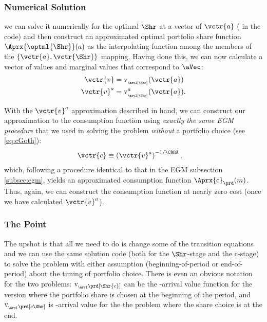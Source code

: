 \documentclass[titlepage, headings=optiontotocandhead]{econtex}
\begin{document}
\subsubsection{Numerical Solution}
we can solve it numerically for the optimal $\Shr$ at a vector of $\vctr{a}$ ({\aVecCode} in the code)  and then construct an approximated optimal portfolio share function $\Aprx{\optml{\Shr}}(a)$ as the interpolating function among the members of the $\{\vctr{a},\vctr{\Shr}\}$ mapping.  Having done this, we can now calculate a vector of values and marginal values that correspond to $\aVec$:
\begin{equation}\begin{gathered}\begin{aligned}
      \vctr{v}  & = \mathrm{v}_{_\arvl[\Shr]}(\vctr{a}) \label{eq:vShrEnd}
\\      \vctr{v}^a  & = \mathrm{v}^{a}_{_\arvl[\Shr]}(\vctr{a}).
    \end{aligned}\end{gathered}\end{equation}

With the $\vctr{v}^{a}$ approximation described in hand, we can construct our approximation to the consumption function using \emph{exactly the same EGM procedure} that we used in solving the problem \emph{without} a portfolio choice (see \eqref{eq:cGoth}):
\begin{equation}\begin{gathered}\begin{aligned}
      \vctr{c}  & \equiv  \left(\vctr{v}^{a}\right)^{-1/\CRRA} \label{eq:cVecPort},
    \end{aligned}\end{gathered}\end{equation}
which, following a procedure identical to that in the EGM subsection \ref{subsec:egm}, yields an approximated consumption function $\Aprx{\mathrm{c}}_{\prd}(m)$.  Thus, again, we can construct the consumption function at nearly zero cost (once we have calculated $\vctr{v}^{a}$).

\hypertarget{the-point}{}

\subsubsection{The Point}\label{subsubsec:the-point}

The upshot is that all we need to do is change some of the transition equations and we can use the same solution code (both for the $\Shr$-stage and the $\mathrm{c}$-stage) to solve the problem with either assumption (beginning-of-period or end-of-period) about the timing of portfolio choice.  There is even an obvious notation for the two problems: $\mathrm{v}_{_\arvl\prd[\Shr{c}]}$ can be the {\interval}-arrival value function for the version where the portfolio share is chosen at the beginning of the period, and $\mathrm{v}_{_\arvl\prd[{c}\Shr]}$ is {\interval}-arrival value for the the problem where the share choice is at the end.
\end{document}
